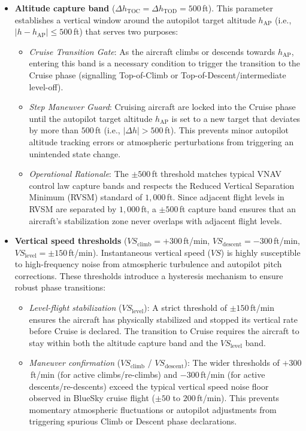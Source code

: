 \begin{itemize}
    \item \textbf{Altitude capture band} ($\Delta h_{\text{TOC}} = \Delta h_{\text{TOD}} = 500$\,ft). This parameter establishes a vertical window around the autopilot target altitude $h_{\text{AP}}$ (i.e., $|h - h_{\text{AP}}| \le 500$\,ft) that serves two purposes:
    \begin{itemize}
        \item \emph{Cruise Transition Gate}: As the aircraft climbs or descends towards $h_{\text{AP}}$, entering this band is a necessary condition to trigger the transition to the Cruise phase (signalling Top-of-Climb or Top-of-Descent/intermediate level-off).
        \item \emph{Step Maneuver Guard}: Cruising aircraft are locked into the Cruise phase until the autopilot target altitude $h_{\text{AP}}$ is set to a new target that deviates by more than $500$\,ft (i.e., $|\Delta h| > 500$\,ft). This prevents minor autopilot altitude tracking errors or atmospheric perturbations from triggering an unintended state change.
        \item \emph{Operational Rationale}: The $\pm 500$\,ft threshold matches typical VNAV control law capture bands and respects the Reduced Vertical Separation Minimum (RVSM) standard of $1{,}000$\,ft. Since adjacent flight levels in RVSM are separated by $1{,}000$\,ft, a $\pm 500$\,ft capture band ensures that an aircraft's stabilization zone never overlaps with adjacent flight levels.
    \end{itemize}

    \item \textbf{Vertical speed thresholds} ($VS_{\text{climb}} = +300$\,ft/min, $VS_{\text{descent}} = -300$\,ft/min, $VS_{\text{level}} = \pm 150$\,ft/min). Instantaneous vertical speed ($VS$) is highly susceptible to high-frequency noise from atmospheric turbulence and autopilot pitch corrections. These thresholds introduce a hysteresis mechanism to ensure robust phase transitions:
    \begin{itemize}
        \item \emph{Level-flight stabilization} ($VS_{\text{level}}$): A strict threshold of $\pm 150$\,ft/min ensures the aircraft has physically stabilized and stopped its vertical rate before Cruise is declared. The transition to Cruise requires the aircraft to stay within both the altitude capture band and the $VS_{\text{level}}$ band.
        \item \emph{Maneuver confirmation} ($VS_{\text{climb}}$ / $VS_{\text{descent}}$): The wider thresholds of $+300$\,ft/min (for active climbs/re-climbs) and $-300$\,ft/min (for active descents/re-descents) exceed the typical vertical speed noise floor observed in BlueSky cruise flight ($\pm 50$ to $200$\,ft/min). This prevents momentary atmospheric fluctuations or autopilot adjustments from triggering spurious Climb or Descent phase declarations.
    \end{itemize}
    

\end{itemize}
